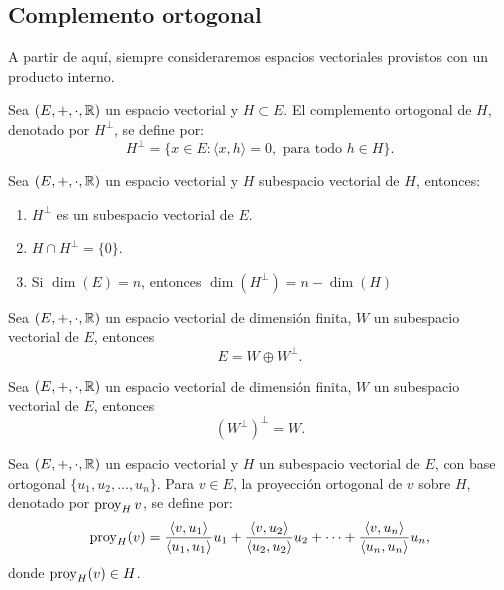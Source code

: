 \documentclass[a4,11pt]{aleph-notas}
\begin{document}
\subsection{Complemento ortogonal}

A partir de aquí, siempre consideraremos espacios vectoriales provistos con un producto interno.

\begin{defi}
    Sea $(E,+,\cdot,\mathbb{R})$ un espacio vectorial y
    $H \subset E$. El complemento ortogonal de $H$, denotado por $H^\perp$, se define por:
    \[
        H^\perp = \{ x \in E: \langle x, h \rangle = 0, \text{ para todo } h \in H\}.
    \]
\end{defi}

\begin{teo}
    Sea $(E,+,\cdot,\mathbb{R})$ un espacio vectorial y
    $H$ subespacio vectorial de $H$, entonces:
    \begin{enumerate}
        \item $H^\perp$ es un subespacio vectorial de $E$.
        \item $H \cap H^\perp = \{0\}$.
        \item Si $\dim(E) = n$, entonces $\dim(H^\perp) = n - \dim(H)$
    \end{enumerate}
\end{teo}


\begin{teo}
    Sea $(E,+,\cdot,\mathbb{R})$ un espacio vectorial de dimensión finita, $W$ un subespacio vectorial de $E$, entonces 
    \[
    E = W \oplus W^\perp.
    \]
\end{teo}

\begin{teo}
    Sea $(E,+,\cdot,\mathbb{R})$ un espacio vectorial de dimensión finita, $W$ un subespacio vectorial de $E$, entonces 
    \[
    \left(W^\perp\right)^\perp =  W.
    \]
\end{teo}

\begin{defi}
    Sea $(E,+,\cdot,\mathbb{R})$ un espacio vectorial y
    $H$ un subespacio vectorial de $E$, con base ortogonal $\{u_1, u_2, \ldots, u_n \}$. Para $v \in E$, la proyección ortogonal de $v$ sobre $H$, denotado por $\operatorname{proy}_H v$, se define por:
    \[
       \operatorname{proy}_H( v) = 
       \dfrac{\langle v,u_1 \rangle}{\langle u_1, u_1 \rangle}u_1 +
       \dfrac{\langle v,u_2 \rangle}{\langle u_2, u_2 \rangle}u_2 +
       \cdots +
       \dfrac{\langle v,u_n \rangle}{\langle u_n, u_n \rangle}u_n,
    \]
    donde $\operatorname{proy}_H (v) \in H$.
\end{defi}
\end{document}
